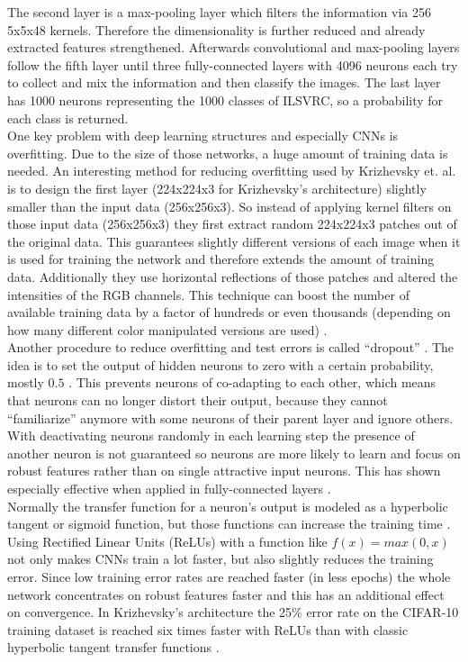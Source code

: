 \documentclass[12pt,twoside]{article}
\theoremstyle{plain}
\theoremstyle{definition}
\theoremstyle{remark}
\begin{document}
The second layer is a max-pooling layer which filters the information via 256 5x5x48 kernels. Therefore the dimensionality is further reduced and already extracted features strengthened.
Afterwards convolutional and max-pooling layers follow the fifth layer until three fully-connected layers with 4096 neurons each try to collect and mix the information and then classify the images. The last layer has 1000 neurons representing the 1000 classes of ILSVRC, so a probability for each class is returned.
\\
One key problem with deep learning structures and especially CNNs is overfitting. Due to the size of those networks, a huge amount of training data is needed. An interesting method for reducing overfitting used by Krizhevsky et. al. is to design the first layer (224x224x3 for Krizhevsky's architecture) slightly smaller than the input data (256x256x3).
So instead of applying kernel filters on those input data (256x256x3) they first extract random 224x224x3 patches out of the original data.
This guarantees slightly different versions of each image when it is used for training the network and therefore extends the amount of training data.
Additionally they use horizontal reflections of those patches and altered the intensities of the RGB channels.
This technique can boost the number of available training data by a factor of hundreds or even thousands (depending on how many different color manipulated versions are used) \cite{ImangeNetClassificationCNN-Krizhevsky}.
\\
Another procedure to reduce overfitting and test errors is called \enquote{dropout} \cite{ImprovingNeuralNetworksDropout-Hinton-Krizhevsky}. The idea is to set the output of hidden neurons to zero with a certain probability, mostly $0.5$ \cite{ImangeNetClassificationCNN-Krizhevsky}. This prevents neurons of co-adapting to each other, which means that neurons can no longer distort their output, because they cannot \enquote{familiarize} anymore with some neurons of their parent layer and ignore others. With deactivating neurons randomly in each learning step the presence of another neuron is not guaranteed so neurons are more likely to learn and focus on robust features rather than on single attractive input neurons.
This has shown especially effective when applied in fully-connected layers \cite{ImangeNetClassificationCNN-Krizhevsky}.
\\
Normally the transfer function for a neuron's output is modeled as a hyperbolic tangent or sigmoid function, but those functions can increase the training time \cite{ImangeNetClassificationCNN-Krizhevsky}. Using Rectified Linear Units (ReLUs) \cite{RectifiedLinearUnits-Hinton} with a function like $f(x) = max(0, x)$ not only makes CNNs train a lot faster, but also slightly reduces the training error. Since low training error rates are reached faster (in less epochs) the whole network concentrates on robust features faster and this has an additional effect on convergence.
In Krizhevsky's architecture the 25\% error rate on the CIFAR-10 training dataset is reached six times faster with ReLUs than with classic hyperbolic tangent transfer functions \cite{ImangeNetClassificationCNN-Krizhevsky}.
\end{document}
